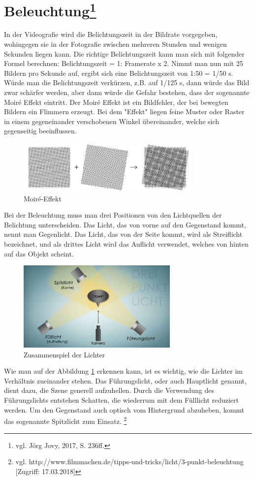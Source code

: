 \section[Beleuchtung]{Beleuchtung\protect\footnote{\label{}vgl. Jörg Jovy, 2017, S. 236ff.}}
In der Videografie wird die Belichtungszeit in der Bildrate vorgegeben, wohingegen sie in der Fotografie zwischen mehreren Stunden und wenigen Sekunden liegen kann.
Die richtige Belichtungszeit kann man sich mit folgender Formel berechnen: Belichtungszeit = 1: Framerate x 2. Nimmt man nun mit 25 Bildern pro Sekunde auf, ergibt sich eine Belichtungszeit von 1:50 = 1/50 s. Würde man die Belichtungszeit verkürzen, z.B. auf 1/125 s, dann würde das Bild zwar schärfer werden, aber dann würde die Gefahr bestehen, dass der sogenannte Moir\'{e} Effekt eintritt. Der Moir\'{e} Effekt ist ein Bildfehler, der bei bewegten Bildern ein Flimmern erzeugt. Bei dem "Effekt" liegen feine Muster oder Raster in einem gegeneinander verschobenen Winkel übereinander, welche sich gegenseitig beeinflussen. 
\begin{figure}[H]
	\centering
	\includegraphics[width=0.8\textwidth]{abb2} 
	\caption{Moir\'{e}-Effekt}
\end{figure}
Bei der Beleuchtung muss man drei Positionen von den Lichtquellen der Belichtung unterscheiden. Das Licht, das von vorne auf den Gegenstand kommt, nennt man Gegenlicht. Das Licht, das von der Seite kommt, wird als Streiflicht bezeichnet, und als drittes Licht wird das Auflicht verwendet, welches von hinten auf das Objekt scheint.
\begin{figure}[H]
	\centering
	\includegraphics[width=0.7\textwidth]{abb3} 
	\caption{Zusammenspiel der Lichter}\label{fig:abb3}
\end{figure}
Wie man auf der Abbildung \ref{fig:abb3} erkennen kann, ist es wichtig, wie die Lichter im Verhältnis zueinander stehen. Das Führungslicht, oder auch Hauptlicht genannt, dient dazu, die Szene generell aufzuhellen. Durch die Verwendung des Führungslichts entstehen Schatten, die wiederrum mit dem Fülllicht reduziert werden. Um den Gegenstand auch optisch vom Hintergrund abzuheben, kommt das sogenannte Spitzlicht zum Einsatz. \footnote{\label{}vgl. http://www.filmmachen.de/tipps-und-tricks/licht/3-punkt-beleuchtung [Zugriff: 17.03.2018]}
